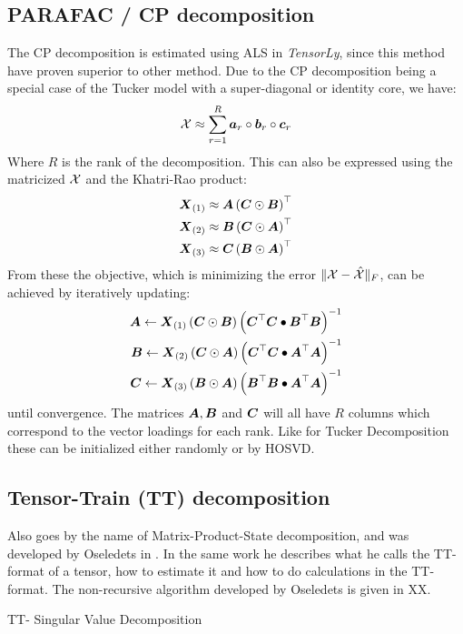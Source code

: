 \subsection{PARAFAC / CP decomposition}
The CP decomposition is estimated using ALS in \textit{TensorLy}, since this method have proven superior to other method\cite[29]{Mørup2011}. Due to the CP decomposition being a special case of the Tucker model with a super-diagonal or identity core, we have:
\begin{equation}
    \mathcal{X} \approx \sum_{r=1}^R \boldsymbol{a}_r \circ \boldsymbol{b}_r \circ \boldsymbol{c}_r
\end{equation}
Where $R$ is the rank of the decomposition. This can also be expressed using the matricized $\mathcal{X}$ and the Khatri-Rao product:
\begin{align}
    \boldsymbol{X}_{(1)} &\approx \boldsymbol{A}\left( \boldsymbol{C} \odot \boldsymbol{B}\right)^\top \\
    \boldsymbol{X}_{(2)} &\approx \boldsymbol{B}\left( \boldsymbol{C} \odot \boldsymbol{A}\right)^\top \\
    \boldsymbol{X}_{(3)} &\approx \boldsymbol{C}\left( \boldsymbol{B} \odot \boldsymbol{A}\right)^\top
\end{align}
From these the objective, which is minimizing the error $\| \mathcal{X} - \hat{\mathcal{X}}\|_F$, can be achieved by iteratively updating:
\begin{align}
    \boldsymbol{A} \leftarrow \boldsymbol{X}_{(1)}\left( \boldsymbol{C} \odot \boldsymbol{B} \right)\left(
    \boldsymbol{C}^\top \boldsymbol{C} \bullet \boldsymbol{B}^\top \boldsymbol{B}\right)^{-1} \\
    \boldsymbol{B} \leftarrow \boldsymbol{X}_{(2)}\left( \boldsymbol{C} \odot \boldsymbol{A} \right)\left(
    \boldsymbol{C}^\top \boldsymbol{C} \bullet \boldsymbol{A}^\top \boldsymbol{A}\right)^{-1} \\
    \boldsymbol{C} \leftarrow \boldsymbol{X}_{(3)}\left( \boldsymbol{B} \odot \boldsymbol{A} \right)\left(
    \boldsymbol{B}^\top \boldsymbol{B} \bullet \boldsymbol{A}^\top \boldsymbol{A}\right)^{-1}
\end{align}
until convergence\cite[28]{Kolda2007}. The matrices $\boldsymbol{A}, \boldsymbol{B}$ and $\boldsymbol{C}$ will all have $R$ columns which correspond to the vector loadings for each rank. Like for Tucker Decomposition these can be initialized either randomly or by HOSVD.

\subsection{Tensor-Train (TT) decomposition}
Also goes by the name of Matrix-Product-State decomposition, and was developed by Oseledets in \cite{Oseledets2011}. In the same work he describes what he calls the TT-format of a tensor, how to estimate it and how to do calculations in the TT-format. The non-recursive algorithm developed by Oseledets is given in XX.

\begin{algorithm} \caption{TT- Singular Value Decomposition} \label{alg:ttsvd}
\begin{algorithmic}[1]
    

\end{algorithmic}

\end{algorithm}